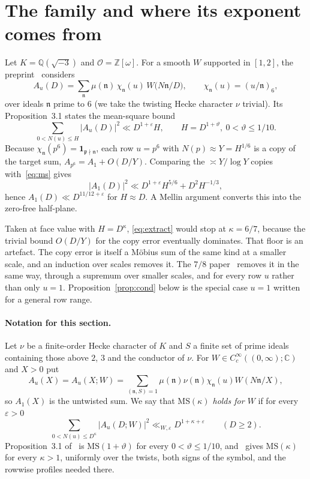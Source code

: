 \documentclass[11pt]{article}
\theoremstyle{remark}
\begin{document}
\section{The family and where its exponent comes from}

Let $K=\mathbb Q(\sqrt{-3})$ and $\mathcal O=\mathbb Z[\omega]$. For a smooth $W$ supported
in $[1,2]$, the preprint~\cite{OAI} considers
\[
A_u(D)=\sum_{\mathfrak n}\mu(\mathfrak n)\,\chi_{\mathfrak n}(u)\,W\!\big(N\mathfrak n/D\big),
\qquad \chi_{\mathfrak n}(u)=(u/\mathfrak n)_6,
\]
over ideals $\mathfrak n$ prime to $6$ (we take the twisting Hecke character $\nu$ trivial).
Its Proposition~3.1 states the mean-square bound
\begin{equation}\label{eq:ms}
\sum_{0<N(u)\le H}|A_u(D)|^2\ll D^{1+\varepsilon}H,\qquad H=D^{1+\vartheta},\ 0<\vartheta\le1/10.
\end{equation}
Because $\chi_{\mathfrak n}(p^6)=\mathbf 1_{\mathfrak p\nmid\mathfrak n}$, each row $u=p^6$
with $N(p)\approx Y=H^{1/6}$ is a copy of the target sum, $A_{p^6}=A_1+O(D/Y)$. Comparing the
$\asymp Y/\log Y$ copies with~\eqref{eq:ms} gives~\cite[Sec.~3]{OAI}
\begin{equation}\label{eq:extract}
|A_1(D)|^2\ll D^{1+\varepsilon}H^{5/6}+D^2H^{-1/3},
\end{equation}
hence $A_1(D)\ll D^{11/12+\varepsilon}$ for $H\approx D$. A Mellin argument converts this
into the zero-free half-plane.

Taken at face value with $H=D^\kappa$, \eqref{eq:extract} would stop at $\kappa=6/7$,
because the trivial bound $O(D/Y)$ for the copy error eventually dominates. That floor is
an artefact. The copy error is itself a Möbius sum of the same kind at a smaller scale, and
an induction over scales removes it. The $7/8$ paper~\cite[Lemma~17.6]{OAI78} removes it in the
same way, through a supremum over smaller scales, and for every row $u$ rather than only $u=1$.
Proposition~\ref{prop:cond} below is the special case $u=1$ written for a general row range.

\paragraph{Notation for this section.} Let $\nu$ be a finite-order Hecke character of $K$
and $S$ a finite set of prime ideals containing those above $2$, $3$ and the conductor of
$\nu$. For $W\in C_c^\infty((0,\infty);\mathbb C)$ and $X>0$ put
\[
A_u(X)=A_u(X;W)=\sum_{(\mathfrak n,S)=1}\mu(\mathfrak n)\nu(\mathfrak n)\chi_{\mathfrak n}(u)
W(N\mathfrak n/X),
\]
so $A_1(X)$ is the untwisted sum. We say that \emph{$\mathrm{MS}(\kappa)$ holds for $W$} if
for every $\varepsilon>0$
\begin{equation}\label{eq:msk}
\sum_{0<N(u)\le D^\kappa}|A_u(D;W)|^2\ll_{W,\varepsilon}D^{1+\kappa+\varepsilon}
\qquad(D\ge2).
\end{equation}
Proposition~3.1 of~\cite{OAI} is $\mathrm{MS}(1+\vartheta)$ for every
$0<\vartheta\le1/10$, and~\cite[(17.87)]{OAI78} gives $\mathrm{MS}(\kappa)$ for every $\kappa>1$,
uniformly over the twists, both signs of the symbol, and the rowwise profiles needed there.
\end{document}
